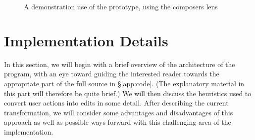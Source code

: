 \begin{figure}
    \centering
    \hfil
    \vspace{4ex}

    \hfil
    \vspace{4ex}

    \hfil
    \vspace{4ex}

    \hfil
    \vspace{4ex}

    \caption{A demonstration use of the prototype, using the composers lens}
    \label{fig:prototype-screenshots}
\end{figure}

\section{Implementation Details}
\label{sec:impl-details}
\label{sec:impl-parsing}
\label{sec:parsing}
In this section, we will begin with a brief overview of the architecture of
the program, with an eye toward guiding the interested reader towards the
appropriate part of the full source in \S\ref{app:code}. (The explanatory
material in this part will therefore be quite brief.) We will then discuss
the heuristics used to convert user actions into edits in some detail. After
describing the current transformation, we will consider some advantages and
disadvantages of this approach as well as possible ways forward with this
challenging area of the implementation.

